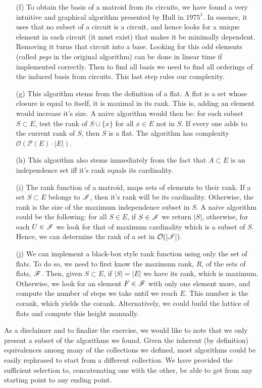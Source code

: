 \begin{itemize}
    \item[(f)] To obtain the basis of a matroid from its circuits, we have found a very intuitive and graphical algorithm presented by Hull in $1975^1$. In essence, it uses that no subset of a circuit is a circuit, and hence looks for a unique element in each circuit (it must exist) that makes it be minimally dependent. Removing it turns that circuit into a base. Looking for this odd elements (called \textit{pegs} in the original algorithm) can be done in linear time if implemented correctly. Then to find all basis we need to find all orderings of the induced basis from circuits. This last step rules our complexity.
    \item[(g)] This algorithm stems from the definition of a flat. A flat is a set whose closure is equal to itself, it is maximal in its rank. This is, adding an element would increase it's size. A naive algorithm would then be: for each subset  $S \subset E$, test the rank of $S \cup \{x \}$ for all $x \in E$ not in $S$. If every one adds to the current rank of $S$, then $S$ is a flat. The algorithm has complexity $\mathcal{O}(\mathcal{P}(E) \cdot |E|)$.
    \item[(h)] This algorithm also stems immediately from the fact that $A \subset E$ is an independence set iff it's rank equals its cardinality.
    \item[(i)] The rank function of a matroid, maps sets of elements to their rank. If a set $S \subset E$ belongs to $\mathscr{I}$, then it's rank will be its cardinality. Otherwise, the rank is the size of the maximum independence subset in $S$. A naive algorithm could be the following: for all $S \in E$, if $S \in \mathscr{I}$ we return $|S|$, otherwise, for each $U \in \mathscr{I}$ we look for that of maximum cardinality which is a subset of $S$. Hence, we can determine the rank of a set in $\mathcal{O}(|\mathscr{I}|)$.
    \item[(j)] We can implement a black-box style rank function using only the set of flats. To do so, we need to first know the maximum rank, $R$, of the sets of flats, $\mathscr{F}$. Then, given $S \subset E$, if $|S| = |E|$ we have its rank, which is maximum. Otherwise, we look for an element $F \in \mathscr{F}$ with only one element more, and compute the number of steps we take until we reach $E$. This number is the corank, which yields the corank. Alternatively, we could build the lattice of flats and compute this height manually.  
\end{itemize}

As a disclaimer and to finalize the exercise, we would like to note that we only present a subset of the algorithms we found.
Given the inherent (by definition) equivalences among many of the collections we defined, most algorithms could be easily rephrased to start from a different collection.
We have provided the sufficient selection to, concatenating one with the other, be able to get from any starting point to any ending point.
